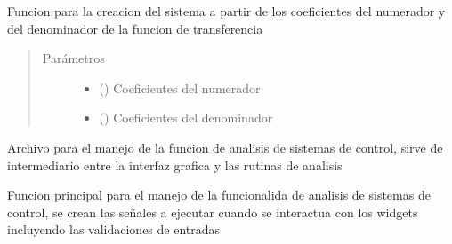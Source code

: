 \documentclass[letterpaper,10pt,spanish]{sphinxmanual}
\begin{document}
\begin{fulllineitems}
\label{\detokenize{codigos/rutinas_analisis:rutinas_analisis.system_creator_tf}}
Funcion para la creacion del sistema a partir de los coeficientes del numerador y del denominador de la funcion de transferencia
\begin{quote}\begin{description}
\item[{Parámetros}] \leavevmode\begin{itemize}
\item {} 
 () \textendash{} Coeficientes del numerador

\item {} 
 () \textendash{} Coeficientes del denominador

\end{itemize}

\end{description}\end{quote}

\end{fulllineitems}

\label{\detokenize{codigos/analisisHandler:module-analisisHandler}}
Archivo para el manejo de la funcion de analisis de sistemas de control, sirve de intermediario entre la interfaz grafica y las rutinas de analisis

\begin{fulllineitems}
\label{\detokenize{codigos/analisisHandler:analisisHandler.AnalisisHandler}}
Funcion principal para el manejo de la funcionalida de analisis de sistemas de control, se crean las señales a ejecutar cuando se interactua con los widgets incluyendo las validaciones de entradas

\end{fulllineitems}
\end{document}
